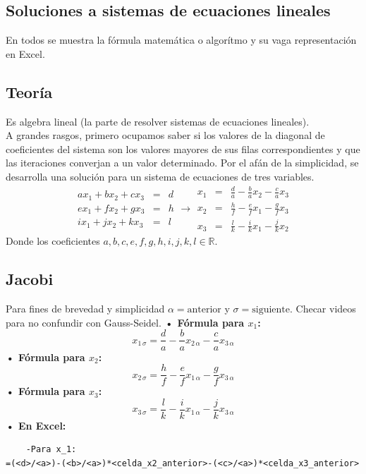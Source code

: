 \documentclass[letterpaper, 12pt]{article}
\begin{document}
    \newpage
    \begin{justify}
        \thispagestyle{fancy}
        \section{Soluciones a sistemas de ecuaciones lineales}
        \justify
        En todos se muestra la fórmula matemática o algorítmo y su vaga representación en Excel.
        \subsection{Teoría}
        \justify
        Es algebra lineal (la parte de resolver sistemas de ecuaciones lineales).\\\newline
        A grandes rasgos, primero ocupamos saber si los valores de la diagonal de coeficientes 
        del sistema son los valores mayores de sus filas correspondientes y que las iteraciones converjan a un valor determinado. 
        Por el afán de la simplicidad, se desarrolla una solución para un sistema de ecuaciones de tres variables.
        {\large\[\begin{matrix}
            ax_1+bx_2+cx_3&=&d\\
            ex_1+fx_2+gx_3&=&h\\
            ix_1+jx_2+kx_3&=&l
        \end{matrix}\rightarrow
        \begin{matrix}
            x_1&=&\frac{d}{a}-\frac{b}{a}x_2-\frac{c}{a}x_3\\
            x_2&=&\frac{h}{f}-\frac{e}{f}x_1-\frac{g}{f}x_3\\
            x_3&=&\frac{l}{k}-\frac{i}{k}x_1-\frac{j}{k}x_2
        \end{matrix}\]}
        Donde los coeficientes \(a,b,c,e,f,g,h,i,j,k,l\in\mathbb{R}\).
        \subsection{Jacobi}
        \justify
        Para fines de brevedad y simplicidad \(\alpha=\text{anterior}\) y \(\sigma=\text{siguiente}\). Checar videos para no confundir con Gauss-Seidel.
        \justify
        \textbf{• Fórmula para \(x_1\):}
        {\large \[x_{1\,\sigma}=\frac{d}{a}-\frac{b}{a}x_{2\,\alpha}-\frac{c}{a}x_{3\, \alpha}\]}
        \justify
        \textbf{• Fórmula para \(x_2\):}
        \justify
        {\large \[x_{2\, \sigma}=\frac{h}{f}-\frac{e}{f}x_{1\, \alpha}-\frac{g}{f}x_{3\, \alpha}\]}
        \textbf{• Fórmula para \(x_3\):}
        \justify
        {\large \[x_{3\, \sigma}=\frac{l}{k}-\frac{i}{k}x_{1\, \alpha}-\frac{j}{k}x_{3\, \alpha}\]}
        \textbf{• En Excel:}
\begin{verbatim}
    -Para x_1:
=(<d>/<a>)-(<b>/<a>)*<celda_x2_anterior>-(<c>/<a>)*<celda_x3_anterior>


\end{verbatim}
\end{justify}
\end{document}
